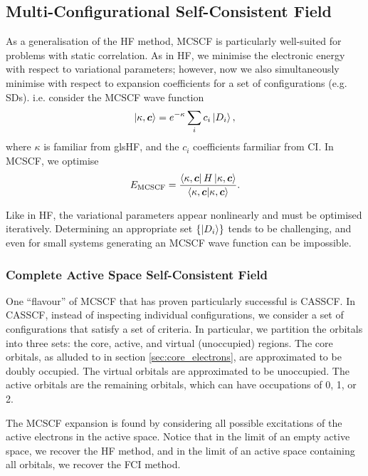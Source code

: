 \subsection{Multi-Configurational Self-Consistent Field}

As a generalisation of the \gls{HF} method, \gls{MCSCF} is particularly well-suited for problems with static correlation. As in \gls{HF}, we minimise the electronic energy with respect to variational parameters; however, now we also simultaneously minimise with respect to expansion coefficients for a set of configurations (e.g. \glspl{SD}). i.e. consider the MCSCF wave function
\begin{equation}
\ket{\kappa,\bm c} = e^{-\kappa}\sum_ic_i\ket{D_i},
\end{equation}
where $\kappa$ is familiar from gls{HF}, and the $c_i$ coefficients farmiliar from \gls{CI}. In MCSCF, we optimise
\begin{equation}
E_\mathrm{MCSCF} = \frac{\bra{\kappa,\bm c}H\ket{\kappa,\bm c}}{\bra{\kappa,\bm c}\ket{\kappa,\bm c}}.
\end{equation}

Like in \gls{HF}, the variational parameters appear nonlinearly and must be optimised iteratively. Determining an appropriate set $\{\ket{D_i}\}$ tends to be challenging, and even for small systems generating an MCSCF wave function can be impossible.

\subsubsection{Complete Active Space Self-Consistent Field}
One ``flavour'' of \gls{MCSCF} that has proven particularly successful is \gls{CASSCF}. In CASSCF, instead of inspecting individual configurations, we consider a set of configurations that satisfy a set of criteria. In particular, we partition the orbitals into three sets: the core, active, and virtual (unoccupied) regions. The core orbitals, as alluded to in section \ref{sec:core_electrons}, are approximated to be doubly occupied. The virtual orbitals are approximated to be unoccupied. The active orbitals are the remaining orbitals, which can have occupations of 0, 1, or 2.

The MCSCF expansion is found by considering all possible excitations of the active electrons in the active space. Notice that in the limit of an empty active space, we recover the \gls{HF} method, and in the limit of an active space containing all orbitals, we recover the \gls{FCI} method.

